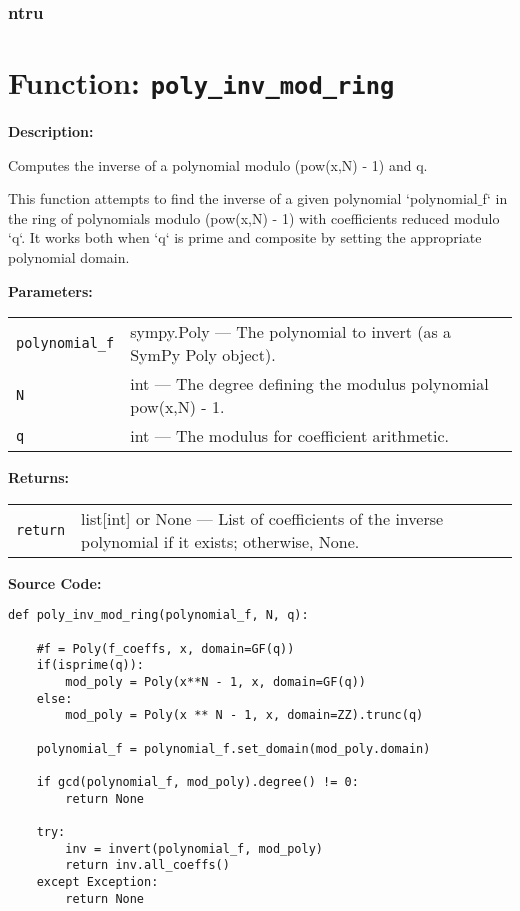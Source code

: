 \documentclass[a4paper,12pt]{article}
\begin{document}





\subsubsection{ntru}

\section*{Function: \texttt{poly\_inv\_mod\_ring}}

\textbf{Description:}

Computes the inverse of a polynomial modulo (pow(x,N) - 1) and q.

This function attempts to find the inverse of a given polynomial `polynomial$\_$f` in the ring
of polynomials modulo (pow(x,N) - 1) with coefficients reduced modulo `q`. It works both when `q`
is prime and composite by setting the appropriate polynomial domain.

\vspace{1em}

\textbf{Parameters:}

\vspace{1em}
\noindent
\begin{tabular}{p{3cm} p{11cm}}
\texttt{polynomial\_f} & sympy.Poly — The polynomial to invert (as a SymPy Poly object). \\
\texttt{N} & int — The degree defining the modulus polynomial pow(x,N) - 1. \\
\texttt{q} & int — The modulus for coefficient arithmetic. \\
\end{tabular}

\vspace{1em}
\noindent
\textbf{Returns:}

\begin{tabular}{p{3cm} p{11cm}}
\texttt{return} & list[int] or None — List of coefficients of the inverse polynomial if it exists; otherwise, None. \\
\end{tabular}

\vspace{1em}
\textbf{Source Code:}

\begin{lstlisting}
def poly_inv_mod_ring(polynomial_f, N, q):

    #f = Poly(f_coeffs, x, domain=GF(q))
    if(isprime(q)):
        mod_poly = Poly(x**N - 1, x, domain=GF(q))
    else:
        mod_poly = Poly(x ** N - 1, x, domain=ZZ).trunc(q)

    polynomial_f = polynomial_f.set_domain(mod_poly.domain)

    if gcd(polynomial_f, mod_poly).degree() != 0:
        return None

    try:
        inv = invert(polynomial_f, mod_poly)
        return inv.all_coeffs()
    except Exception:
        return None
\end{lstlisting}
\end{document}
